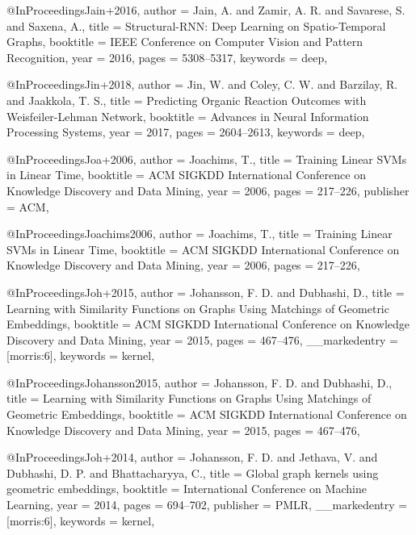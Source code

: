 @InProceedings{Jain+2016,
  author    = {Jain, A. and Zamir, A. R. and Savarese, S. and Saxena, A.},
  title     = {Structural-{RNN}: Deep Learning on Spatio-Temporal Graphs},
  booktitle = {IEEE Conference on Computer Vision and Pattern Recognition},
  year      = {2016},
  pages     = {5308--5317},
  keywords  = {deep},
}

@InProceedings{Jin+2018,
  author    = {Jin, W. and Coley, C. W. and Barzilay, R. and Jaakkola, T. S.},
  title     = {Predicting Organic Reaction Outcomes with {W}eisfeiler-{L}ehman Network},
  booktitle = {Advances in Neural Information Processing Systems},
  year      = {2017},
  pages     = {2604--2613},
  keywords  = {deep},
}

@InProceedings{Joa+2006,
  author    = {Joachims, T.},
  title     = {Training Linear {{SVMs}} in Linear Time},
  booktitle = {ACM SIGKDD International Conference on Knowledge Discovery and Data Mining},
  year      = {2006},
  pages     = {217--226},
  publisher = {ACM},
}

@InProceedings{Joachims2006,
  author    = {Joachims, T.},
  title     = {Training Linear {{SVMs}} in Linear Time},
  booktitle = {ACM SIGKDD International Conference on Knowledge Discovery and Data Mining},
  year      = {2006},
  pages     = {217--226},
}

@InProceedings{Joh+2015,
  author        = {Johansson, F. D. and Dubhashi, D.},
  title         = {Learning with Similarity Functions on Graphs Using Matchings of Geometric Embeddings},
  booktitle     = {ACM SIGKDD International Conference on Knowledge Discovery and Data Mining},
  year          = {2015},
  pages         = {467--476},
  __markedentry = {[morris:6]},
  keywords      = {kernel},
}

@InProceedings{Johansson2015,
  author    = {Johansson, F. D. and Dubhashi, D.},
  title     = {Learning with Similarity Functions on Graphs Using Matchings of Geometric Embeddings},
  booktitle = {ACM SIGKDD International Conference on Knowledge Discovery and Data Mining},
  year      = {2015},
  pages     = {467--476},
}

@InProceedings{Joh+2014,
  author        = {Johansson, F. D. and Jethava, V. and Dubhashi, D. P. and Bhattacharyya, C.},
  title         = {Global graph kernels using geometric embeddings},
  booktitle     = {International Conference on Machine Learning},
  year          = {2014},
  pages         = {694--702},
  publisher     = {PMLR},
  __markedentry = {[morris:6]},
  keywords      = {kernel},
}

